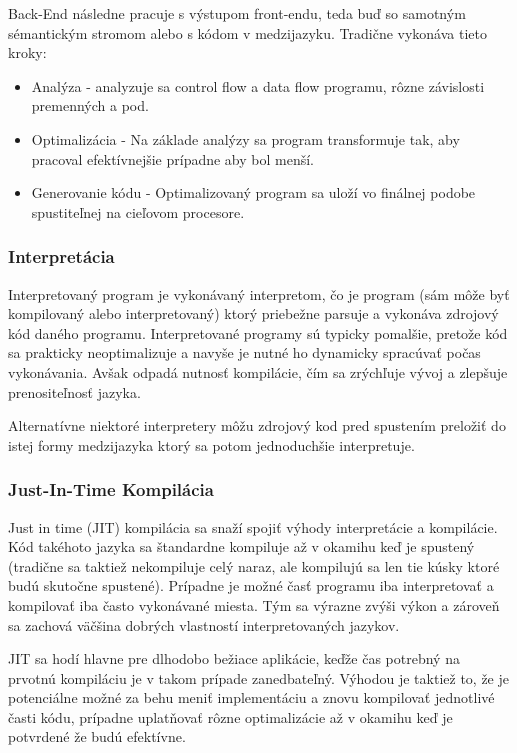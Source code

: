 \documentclass[a4paper,10pt]{article}
\begin{document}
\begin{multicols}{2}
		Back-End následne pracuje s výstupom front-endu, teda buď so samotným sémantickým stromom alebo s kódom v medzijazyku. Tradične vykonáva tieto kroky:
		
		\begin{itemize}
			\item Analýza - analyzuje sa control flow a data flow programu, rôzne závislosti premenných a pod.
			\item Optimalizácia - Na základe analýzy sa program transformuje tak, aby pracoval efektívnejšie prípadne aby bol menší.
			\item Generovanie kódu - Optimalizovaný program sa uloží vo finálnej podobe spustiteľnej na cieľovom procesore.
		\end{itemize}
		
	\subsubsection{Interpretácia}
	
		Interpretovaný program je vykonávaný interpretom, čo je program (sám môže byť kompilovaný alebo interpretovaný) ktorý priebežne parsuje a vykonáva zdrojový kód daného programu. Interpretované programy sú typicky pomalšie, pretože kód sa prakticky neoptimalizuje a navyše je nutné ho dynamicky spracúvať počas vykonávania. Avšak odpadá nutnosť kompilácie, čím sa zrýchľuje vývoj a zlepšuje prenositeľnosť jazyka. 
		
		Alternatívne niektoré interpretery môžu zdrojový kod pred spustením preložiť do istej formy medzijazyka ktorý sa potom jednoduchšie interpretuje.
		
	\subsubsection{Just-In-Time Kompilácia}
	
		Just in time (JIT) kompilácia sa snaží spojiť výhody interpretácie a kompilácie. Kód takéhoto jazyka sa štandardne kompiluje až v okamihu keď je spustený (tradične sa taktiež nekompiluje celý naraz, ale kompilujú sa len tie kúsky ktoré budú skutočne spustené). Prípadne je možné časť programu iba interpretovať a kompilovať iba často vykonávané miesta. Tým sa výrazne zvýši výkon a zároveň sa zachová väčšina dobrých vlastností interpretovaných jazykov.
		
		JIT sa hodí hlavne pre dlhodobo bežiace aplikácie, keďže čas potrebný na prvotnú kompiláciu je v takom prípade zanedbateľný. Výhodou je taktiež to, že je potenciálne možné za behu meniť implementáciu a znovu kompilovať jednotlivé časti kódu, prípadne uplatňovať rôzne optimalizácie až v okamihu keď je potvrdené že budú efektívne.
		
\end{multicols}
\end{document}
